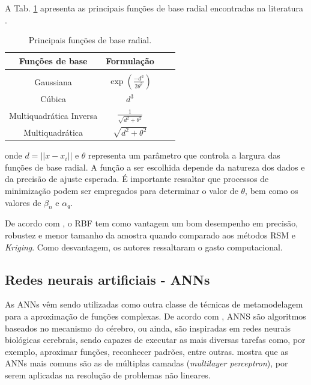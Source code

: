A Tab. \ref{funcbase} apresenta as principais funções de base radial encontradas na literatura \cite{BOUHLEL2019}. \\

\begin{table}[H]
	\caption{Principais funções de base radial.} \label{funcbase} 
	\centering
	\begin{tabular}{ c c c c}
		\hline
		Funções de base & Formulação \\
		\hline \\[2pt] 
		Gaussiana & $ \exp\left(\frac{-{{d}^2}} {2{\theta}^2}\right)  $ \\[7pt]
		Cúbica &  ${d^3}$ \\[7pt] 
		Multiquadrática Inversa &  $\frac{1} {\sqrt{d^{2}+\theta^{2}}}$ \\[7pt]
		Multiquadrática &  ${\sqrt{d^{2}+\theta^{2}}}$ \\[7pt]
		\hline
	\end{tabular}
\end{table}

\noindent onde $d=||x-x_{i} ||$ e $\theta$ representa um parâmetro que controla a largura das funções de base radial. A função a ser escolhida depende da natureza dos dados e da precisão de ajuste esperada. É importante ressaltar que processos de minimização podem ser empregados para determinar o valor de $\theta$, bem como os valores de ${\beta_n}$ e ${\alpha}_q$. 

De acordo com , o RBF tem como vantagem um bom desempenho em precisão, robustez e menor tamanho da amostra quando comparado aos métodos RSM e {\it Kriging}. Como desvantagem, os autores ressaltaram o gasto computacional. 

\subsection{Redes neurais artificiais - ANNs}

As ANNs vêm sendo utilizadas como outra classe de técnicas de metamodelagem para a aproximação de funções complexas.  De acordo com , ANNS são algoritmos baseados no mecanismo do cérebro, ou ainda, são inspiradas em redes neurais biológicas cerebrais, sendo capazes de executar as mais diversas tarefas como, por exemplo, aproximar funções, reconhecer padrões, entre outras.  mostra que as ANNs mais comuns são as de múltiplas camadas (\textit{multilayer perceptron}), por serem aplicadas na resolução de problemas não lineares. 

